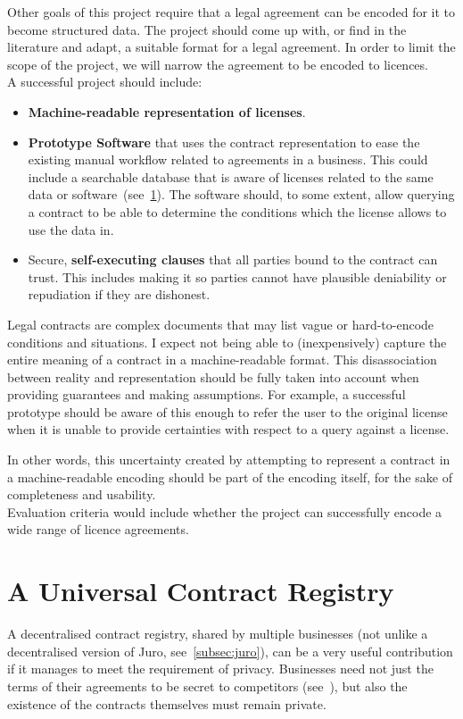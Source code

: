 
Other goals of this project require that a legal agreement can be encoded for it to become
structured data.
The project should come up with, or find in the literature and adapt, a suitable format for a legal
agreement.
In order to limit the scope of the project, we will narrow the agreement to be encoded to
licences.\\

A successful project should include:
\begin{itemize}
    \item \textbf{Machine-readable representation of licenses}.
    \item \textbf{Prototype Software} that uses the contract representation to ease the existing
    manual workflow related to agreements in a business.
    This could include a searchable database that is aware of licenses related to the same data or
    software~(see~\ref{sec:contract-registry}).
    The software should, to some extent, allow querying a contract to be able to determine the
    conditions which the license allows to use the data in.
    \item Secure, \textbf{self-executing clauses} that all parties bound to the contract can trust.
    This includes making it so parties cannot have plausible deniability or repudiation if they are
    dishonest.
\end{itemize}

Legal contracts are complex documents that may list vague or hard-to-encode conditions and
situations.
I expect not being able to (inexpensively) capture the entire meaning of a contract in a
machine-readable format.
This disassociation between reality and representation should be fully taken into account when
providing guarantees and making assumptions.
For example, a successful prototype should be aware of this enough to refer the user to the original
license when it is unable to provide certainties with respect to a query against a license.

In other words, this uncertainty created by attempting to represent a contract in a machine-readable
encoding should be part of the encoding itself, for the sake of completeness and usability.\\

Evaluation criteria would include whether the project can successfully encode a wide range of
licence agreements.


\section{A Universal Contract Registry}\label{sec:contract-registry}

A decentralised contract registry, shared by multiple businesses (not unlike a decentralised version
of Juro, see~\ref{subsec:juro}), can be a very useful contribution if it manages to meet the
requirement of privacy.
Businesses need not just the terms of their agreements to be secret to competitors
(see~\cite[]{economistIU2016licence}), but also the existence of the contracts
themselves must remain private.
